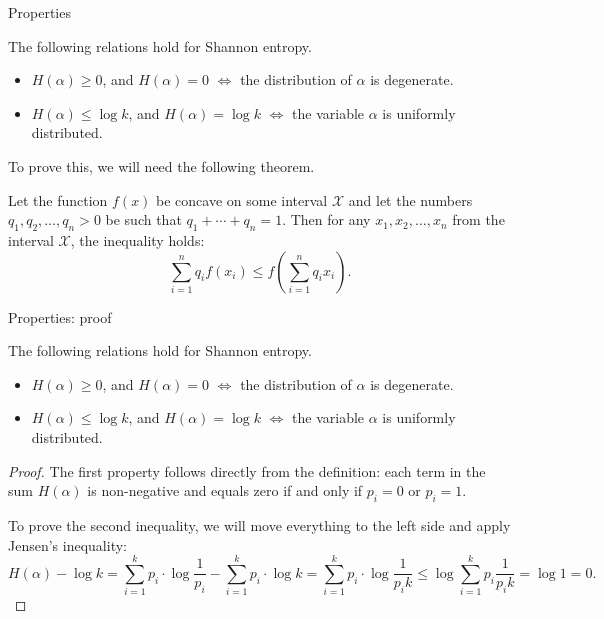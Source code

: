 \documentclass[handout,aspectratio=169]{beamer}
\newcommand{\seqn}[2]{{#1}_1,{#1}_2,\dotsc,{#1}_{#2}}
\begin{document}
\begin{frame}{Properties}
    \begin{lemma}\label{lm:entropy-properties}
    The following relations hold for Shannon entropy.
    \begin{itemize}
        \item \(H(\alpha) \ge 0\), and \(H(\alpha) = 0\) \(\iff\) the distribution of \(\alpha\) is degenerate.

        \item \(H(\alpha) \le \log k\), and \(H(\alpha) = \log k\) \(\iff\) the variable \(\alpha\) is uniformly distributed.

    \end{itemize}
\end{lemma}
\medskip\pause

To prove this, we will need the following theorem.

\begin{theorem}
    Let the function \(f(x)\) be concave on some interval \(\mathcal{X}\) and let the numbers \(\seqn{q}{n} > 0\) be such that \(q_1 + \dotsb + q_n = 1\). Then for any \(\seqn{x}{n}\) from the interval \(\mathcal{X}\), the inequality holds:
    \[
    \sum_{i=1}^{n} q_{i} f(x_{i}) \leq f\left(\sum_{i=1}^{n} q_{i} x_{i}\right).
    \]
\end{theorem}



\end{frame}

\begin{frame}{Properties: proof}
        \begin{lemma}\label{lm:entropy-properties}
        The following relations hold for Shannon entropy.
        \begin{itemize}
            \item \(H(\alpha) \ge 0\), and \(H(\alpha) = 0\) \(\iff\) the distribution of \(\alpha\) is degenerate.

            \item \(H(\alpha) \le \log k\), and \(H(\alpha) = \log k\) \(\iff\) the variable \(\alpha\) is uniformly distributed.

        \end{itemize}
    \end{lemma}
    \begin{proof}
        The first property follows directly from the definition: each term in the sum \(H(\alpha)\) is non-negative and equals zero if and only if \(p_i = 0\) or \(p_i = 1\).

        To prove the second inequality, we will move everything to the left side and apply Jensen's inequality:
        \[
        H(\alpha) - \log k
        = \sum_{i=1}^k p_i \cdot \log \frac{1}{p_i} - \sum_{i=1}^k p_i \cdot \log k
        = \sum_{i=1}^k p_i \cdot \log \frac{1}{p_i k}
        \le \log\sum_{i=1}^k p_i \frac{1}{p_i k} = \log 1 = 0.
        \]
    \end{proof}
\end{frame}
\end{document}
